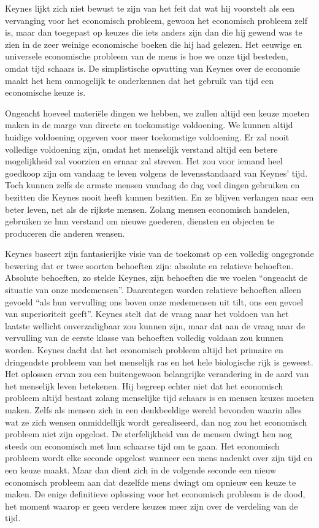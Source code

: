 Keynes lijkt zich niet bewust te zijn van het feit dat wat hij voorstelt
als een vervanging voor het economisch probleem, gewoon het economisch
probleem zelf is, maar dan toegepast op keuzes die iets anders zijn dan
die hij gewend was te zien in de zeer weinige economische boeken die hij
had gelezen. Het eeuwige en universele economische probleem van de mens
is hoe we onze tijd besteden, omdat tijd schaars is. De simplistische
opvatting van Keynes over de economie maakt het hem onmogelijk te
onderkennen dat het gebruik van tijd een economische keuze is.

Ongeacht hoeveel materiële dingen we hebben, we zullen altijd een keuze
moeten maken in de marge van directe en toekomstige voldoening. We
kunnen altijd huidige voldoening opgeven voor meer toekomstige
voldoening. Er zal nooit volledige voldoening zijn, omdat het menselijk
verstand altijd een betere mogelijkheid zal voorzien en ernaar zal
streven. Het zou voor iemand heel goedkoop zijn om vandaag te leven
volgens de levensstandaard van Keynes' tijd. Toch
kunnen zelfs de armste mensen vandaag de dag veel dingen gebruiken en
bezitten die Keynes nooit heeft kunnen bezitten. En ze blijven verlangen
naar een beter leven, net als de rijkste mensen. Zolang mensen
economisch handelen, gebruiken ze hun verstand om nieuwe goederen,
diensten en objecten te produceren die anderen wensen.

Keynes baseert zijn fantasierijke visie van de toekomst op een volledig
ongegronde bewering dat er twee soorten behoeften zijn: absolute en
relatieve behoeften. Absolute behoeften, zo stelde Keynes, zijn
behoeften die we voelen \enquote{ongeacht de situatie van onze medemensen}.
Daarentegen worden relatieve behoeften alleen gevoeld \enquote{als hun
vervulling ons boven onze medemensen uit tilt, ons een gevoel van
superioriteit geeft}.\autocite{46} Keynes stelt dat de vraag naar het voldoen 
van het laatste wellicht onverzadigbaar zou kunnen zijn, maar dat aan de vraag 
naar de vervulling van de eerste klasse van behoeften volledig voldaan zou 
kunnen worden. Keynes dacht dat het economisch probleem altijd het primaire en
dringendste probleem van het menselijk ras en het hele biologische rijk
is geweest. Het oplossen ervan zou een buitengewoon belangrijke
verandering in de aard van het menselijk leven betekenen. Hij begreep
echter niet dat het economisch probleem altijd bestaat zolang menselijke
tijd schaars is en mensen keuzes moeten maken. Zelfs als mensen zich in
een denkbeeldige wereld bevonden waarin alles wat ze zich wensen
onmiddellijk wordt gerealiseerd, dan nog zou het economisch probleem
niet zijn opgelost. De sterfelijkheid van de mensen dwingt hen nog
steeds om economisch met hun schaarse tijd om te gaan. Het economisch
probleem wordt elke seconde opgelost wanneer een mens nadenkt over zijn
tijd en een keuze maakt. Maar dan dient zich in de volgende seconde een
nieuw economisch probleem aan dat dezelfde mens dwingt om opnieuw een
keuze te maken. De enige definitieve oplossing voor het economisch
probleem is de dood, het moment waarop er geen verdere keuzes meer zijn
over de verdeling van de tijd.

